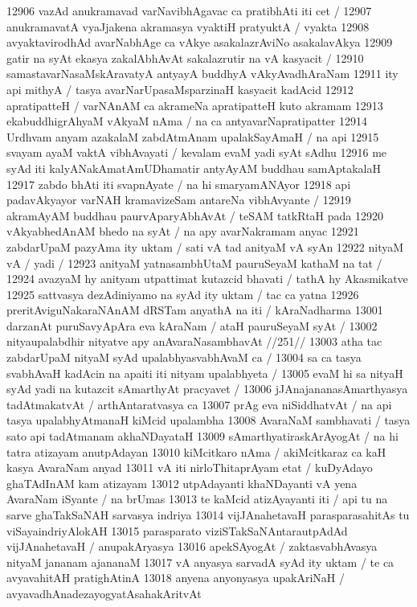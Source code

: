 12906 vazAd anukramavad varNavibhAgavac ca pratibhAti iti cet /  
12907 anukramavatA vyaJjakena akramasya vyaktiH pratyuktA / vyakta  
12908 avyaktavirodhAd avarNabhAge ca vAkye asakalazrAviNo asakalavAkya
12909 gatir na syAt ekasya zakalAbhAvAt sakalazrutir na vA kasyacit / 
12910 samastavarNasaMskAravatyA antyayA buddhyA vAkyAvadhAraNam
12911 ity api mithyA / tasya avarNarUpasaMsparzinaH kasyacit kadAcid 
12912 apratipatteH / varNAnAM ca akrameNa apratipatteH kuto akramam  
12913 ekabuddhigrAhyaM vAkyaM nAma / na ca antyavarNapratipatter
12914 Urdhvam anyam azakalaM zabdAtmAnam upalakSayAmaH / na api  
12915 svayam ayaM vaktA vibhAvayati / kevalam evaM yadi syAt sAdhu 
12916 me syAd iti kalyANakAmatAmUDhamatir antyAyAM buddhau samAptakalaH
12917 zabdo bhAti iti svapnAyate / na hi smaryamANAyor 
12918 api padavAkyayor varNAH kramavizeSam antareNa vibhAvyante / 
12919 akramAyAM buddhau paurvAparyAbhAvAt / teSAM tatkRtaH pada 
12920 vAkyabhedAnAM bhedo na syAt / na apy avarNakramam anyac 
12921 zabdarUpaM pazyAma ity uktam / sati vA tad anityaM vA syAn 
12922 nityaM vA / yadi / 
12923 	anityaM yatnasambhUtaM pauruSeyaM kathaM na tat /
12924 avazyaM hy anityam utpattimat kutazcid bhavati / tathA hy Akasmikatve
12925 sattvasya dezAdiniyamo na syAd ity uktam / tac ca yatna 
12926 preritAviguNakaraNAnAM dRSTam anyathA na iti / kAraNadharma
13001 darzanAt puruSavyApAra eva kAraNam / ataH pauruSeyaM syAt /
13002 	nityaupalabdhir nityatve apy anAvaraNasambhavAt //251// 
13003 atha tac zabdarUpaM nityaM syAd upalabhyasvabhAvaM ca /  
13004 sa ca tasya svabhAvaH kadAcin na apaiti iti nityam upalabhyeta /  
13005 evaM hi sa nityaH syAd yadi na kutazcit sAmarthyAt pracyavet /
13006 jJAnajananasAmarthyasya tadAtmakatvAt / arthAntaratvasya ca  
13007 prAg eva niSiddhatvAt / na api tasya upalabhyAtmanaH kiMcid upalambha
13008 AvaraNaM sambhavati / tasya sato api tadAtmanam akhaNDayataH
13009 sAmarthyatiraskArAyogAt / na hi tatra atizayam anutpAdayan
13010 kiMcitkaro nAma / akiMcitkaraz ca kaH kasya AvaraNam anyad  
13011 vA iti nirloThitaprAyam etat / kuDyAdayo ghaTAdInAM kam atizayam
13012 utpAdayanti khaNDayanti vA yena AvaraNam iSyante / na brUmas 
13013 te kaMcid atizAyayanti iti / api tu na sarve ghaTakSaNAH sarvasya indriya
13014 vijJAnahetavaH parasparasahitAs tu viSayaindriyAlokAH
13015 parasparato viziSTakSaNAntarautpAdAd vijJAnahetavaH / anupakAryasya
13016 apekSAyogAt / zaktasvabhAvasya nityaM jananam ajananaM  
13017 vA anyasya sarvadA syAd ity uktam / te ca avyavahitAH pratighAtinA  
13018 anyena anyonyasya upakAriNaH / avyavadhAnadezayogyatAsahakAritvAt 
